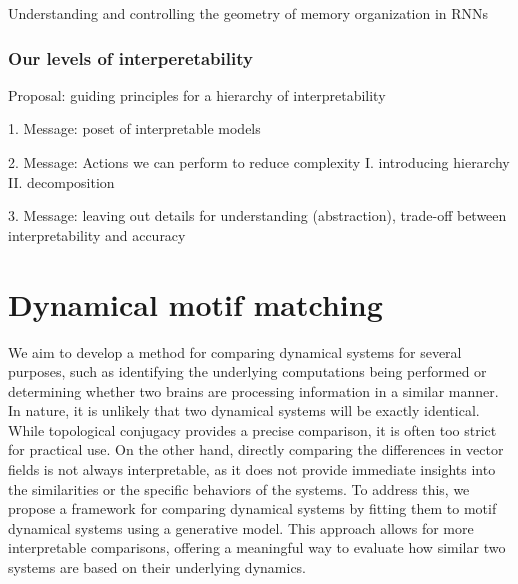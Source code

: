 \documentclass{article}
\theoremstyle{definition} \newtheorem{definition}{Definition}  \newtheorem{example}{Example}
\theoremstyle{remark} \newtheorem{remark}{Remark}
\newcounter{ct}
\begin{document}
Understanding and controlling the geometry of memory organization in RNNs \citep{haputhanthri2025understanding}






\subsubsection{Our levels of interperetability}
Proposal: guiding principles for a hierarchy of interpretability

1. Message: poset of interpretable models

2. Message: Actions we can perform to reduce complexity
I. introducing hierarchy 
\citep{Vermani2024b}
\citep{geadah2024parsing, geadah2025modeling}
II. decomposition

3. Message: leaving out details for understanding (abstraction), trade-off between interpretability and accuracy






\section{Dynamical motif matching}\label{sec:dmm}
We aim to develop a method for comparing dynamical systems for several purposes, such as identifying the underlying computations being performed or determining whether two brains are processing information in a similar manner. In nature, it is unlikely that two dynamical systems will be exactly identical.
 While topological conjugacy provides a precise comparison, it is often too strict for practical use.
 On the other hand, directly comparing the differences in vector fields is not always interpretable, as it does not provide immediate insights into the similarities or the specific behaviors of the systems.
  To address this, we propose a framework for comparing dynamical systems by fitting them to motif dynamical systems using a generative model.
   This approach allows for more interpretable comparisons, offering a meaningful way to evaluate how similar two systems are based on their underlying dynamics.
\end{document}
